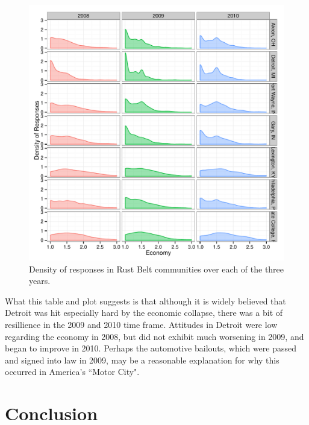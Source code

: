 \documentclass[11pt]{article}\usepackage{knitr}
\begin{document}
\begin{knitrout}
\color{fgcolor}\begin{figure}[H]


{\centering \includegraphics[width=\maxwidth]{figure/rb_one} 

}

\caption[Density of responses in Rust Belt communities over each of the three years]{Density of responses in Rust Belt communities over each of the three years.\label{fig:rb_one}}
\end{figure}


\end{knitrout}


What this table and plot suggests is that although it is widely believed that Detroit was hit especially hard by the economic collapse, there was a bit of resillience in the 2009 and 2010 time frame. Attitudes in Detroit were low regarding the economy in 2008, but did not exhibit much worsening in 2009, and began to improve in 2010. Perhaps the automotive bailouts, which were passed and signed into law in 2009, may be a reasonable explanation for why this occurred in America's ``Motor City".


\section*{Conclusion}
\end{document}
